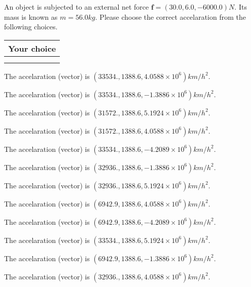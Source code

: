 \documentclass[12pt]{article}
\begin{document}
  
 
An object is subjected to an external net force $\mathbf{f}=(
30.0 ,
6.0,
-6000.0  )N$. Its mass is known as
$m= %
56.0  kg$. Please choose the correct accelaration
from the following choices.
 
  
  
\noindent\hspace{3.0in} \begin{tabular}{|l|}
\hline
Your choice \\
\hline
 \\ 
 \\ 
\hline
\end{tabular}
  
  
 
 
The accelaration (vector) is
$(
33534.,
1388.6 ,
4.0588 \times 10^{6}
)km/h^2.
$
 
 
The accelaration (vector) is
$(
33534.,
1388.6 ,
-1.3886 \times 10^{6}
)km/h^2.
$
 
 
The accelaration (vector) is
$(
31572.,
1388.6 ,
5.1924 \times 10^{6}
)km/h^2.
$
 
 
The accelaration (vector) is
$(
31572.,
1388.6 ,
4.0588 \times 10^{6}
)km/h^2.
$
 
 
The accelaration (vector) is
$(
33534.,
1388.6 ,
-4.2089 \times 10^{6}
)km/h^2.
$
 
 
The accelaration (vector) is
$(
32936.,
1388.6 ,
-1.3886 \times 10^{6}
)km/h^2.
$
 
 
The accelaration (vector) is
$(
32936.,
1388.6 ,
5.1924 \times 10^{6}
)km/h^2.
$
 
 
The accelaration (vector) is
$(
6942.9,
1388.6 ,
4.0588 \times 10^{6}
)km/h^2.
$
 
 
The accelaration (vector) is
$(
6942.9,
1388.6 ,
-4.2089 \times 10^{6}
)km/h^2.
$
 
 
The accelaration (vector) is
$(
33534.,
1388.6 ,
5.1924 \times 10^{6}
)km/h^2.
$
 
 
The accelaration (vector) is
$(
6942.9,
1388.6 ,
-1.3886 \times 10^{6}
)km/h^2.
$
 
 
The accelaration (vector) is
$(
32936.,
1388.6 ,
4.0588 \times 10^{6}
)km/h^2.
$
 
\end{document}
